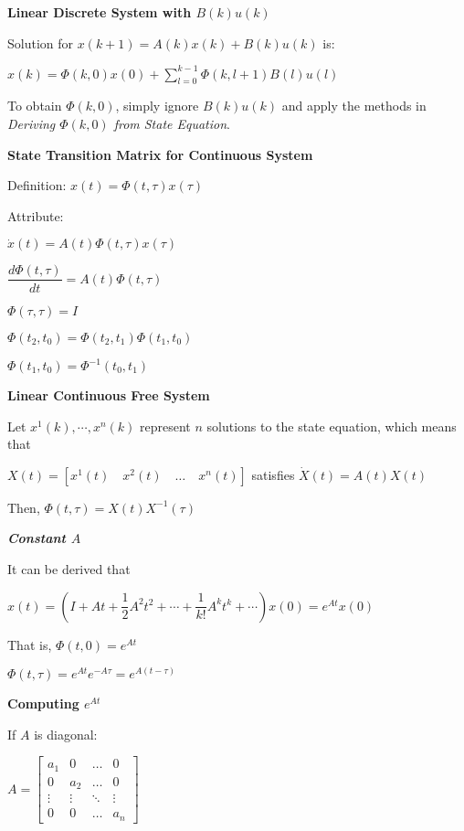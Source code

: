 \documentclass{article}
\newcommand{\bigtitle}[1]{
	\noindent
	\textbf{#1}
}
\newcommand{\smalltitle}[1]{
	\noindent
	\textbf{\textit{#1}}
}
\newcommand{\properframed}[1]{
	{
		\centering
		\vspace{-2 ex}
		\begin{framed}
			\vspace{-1.5 ex}
			#1
			\vspace{-1.5 ex}
		\end{framed}
		\vspace{-2 ex}
	}
}
\begin{document}
\begin{spacing}{1.2}
\bigtitle{Linear Discrete System with $B(k)u(k)$}

Solution for $x(k+1)=A(k) x(k)+B(k) u(k)$ is:

\properframed{
$x(k)=\Phi(k,0)x(0) + \sum \limits_{l=0}^{k-1}\Phi(k,l+1)B(l)u(l)$
}

To obtain $\Phi(k,0)$, simply ignore $B(k)u(k)$ and apply the methods in \textit{Deriving $\Phi(k,0)$ from State Equation}.

\bigtitle{State Transition Matrix for Continuous System}

Definition: $x(t)=\Phi(t, \tau) x(\tau)$

Attribute:

$\dot{x}(t)=A(t) \Phi(t, \tau) x(\tau)$

$\dfrac{d \Phi(t, \tau)}{d t}=A(t) \Phi(t, \tau)$

$\Phi(\tau, \tau)=I$

$\Phi\left(t_{2}, t_{0}\right)=\Phi\left(t_{2}, t_{1}\right) \Phi\left(t_{1}, t_{0}\right)$

$\Phi\left(t_{1}, t_{0}\right)=\Phi^{-1}\left(t_{0}, t_{1}\right)$


\bigtitle{Linear Continuous Free System}

Let $x^1(k),\cdots, x^n(k)$ represent $n$ solutions to the state equation, which means that

$X(t) = \left[ x^1(t) \quad x^2(t) \quad \ldots \quad x^n(t) \right]$ satisfies $\dot{X}(t)=A(t) X(t)$

Then, $\Phi(t, \tau)=X(t) X^{-1}(\tau)$

\smalltitle{Constant $A$}

It can be derived that 

$x(t) = \left( I+At+\dfrac{1}{2}A^2t^2 + \cdots + \dfrac{1}{k!}A^kt^k + \cdots \right) x(0)= e^{At}x(0)$

That is,
$\Phi(t,0) = e^{At}$

$\Phi(t, \tau)=e^{A t} e^{-A \tau}=e^{A(t-\tau)}$

\bigtitle{Computing $e^{At}$}

If $A$ is diagonal:

$A=\left[ \begin{array}{cccc}{a_{1}} & {0} & {\dots} & {0} \\ {0} & {a_{2}} & {\dots} & {0} \\ {\vdots} & {\vdots} & {\ddots} & {\vdots} \\ {0} & {0} & {\dots} & {a_{n}}\end{array}\right]$


\end{spacing}
\end{document}
